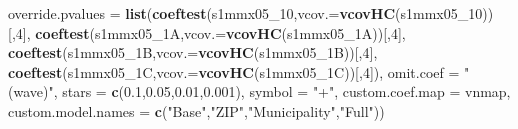 \documentclass[
]{article}
\newenvironment{Shaded}{\begin{snugshade}}{\end{snugshade}}
\newcommand{\DataTypeTok}[1]{\textcolor[rgb]{0.13,0.29,0.53}{#1}}
\newcommand{\DecValTok}[1]{\textcolor[rgb]{0.00,0.00,0.81}{#1}}
\newcommand{\FloatTok}[1]{\textcolor[rgb]{0.00,0.00,0.81}{#1}}
\newcommand{\KeywordTok}[1]{\textcolor[rgb]{0.13,0.29,0.53}{\textbf{#1}}}
\newcommand{\NormalTok}[1]{#1}
\newcommand{\StringTok}[1]{\textcolor[rgb]{0.31,0.60,0.02}{#1}}
\begin{document}
\begin{Shaded}
\begin{Highlighting}[]
          \DataTypeTok{override.pvalues =} \KeywordTok{list}\NormalTok{(}\KeywordTok{coeftest}\NormalTok{(s1mmx05_}\DecValTok{10}\NormalTok{,}\DataTypeTok{vcov.=}\KeywordTok{vcovHC}\NormalTok{(s1mmx05_}\DecValTok{10}\NormalTok{))[,}\DecValTok{4}\NormalTok{],}
                                  \KeywordTok{coeftest}\NormalTok{(s1mmx05_1A,}\DataTypeTok{vcov.=}\KeywordTok{vcovHC}\NormalTok{(s1mmx05_1A))[,}\DecValTok{4}\NormalTok{],}
                                  \KeywordTok{coeftest}\NormalTok{(s1mmx05_1B,}\DataTypeTok{vcov.=}\KeywordTok{vcovHC}\NormalTok{(s1mmx05_1B))[,}\DecValTok{4}\NormalTok{],}
                                  \KeywordTok{coeftest}\NormalTok{(s1mmx05_1C,}\DataTypeTok{vcov.=}\KeywordTok{vcovHC}\NormalTok{(s1mmx05_1C))[,}\DecValTok{4}\NormalTok{]),}
          \DataTypeTok{omit.coef =} \StringTok{"(wave)"}\NormalTok{, }\DataTypeTok{stars =} \KeywordTok{c}\NormalTok{(}\FloatTok{0.1}\NormalTok{,}\FloatTok{0.05}\NormalTok{,}\FloatTok{0.01}\NormalTok{,}\FloatTok{0.001}\NormalTok{), }\DataTypeTok{symbol =} \StringTok{"+"}\NormalTok{,}
          \DataTypeTok{custom.coef.map =}\NormalTok{ vnmap, }
          \DataTypeTok{custom.model.names =} \KeywordTok{c}\NormalTok{(}\StringTok{"Base"}\NormalTok{,}\StringTok{"ZIP"}\NormalTok{,}\StringTok{"Municipality"}\NormalTok{,}\StringTok{"Full"}\NormalTok{))}
\end{Highlighting}
\end{Shaded}
\end{document}
